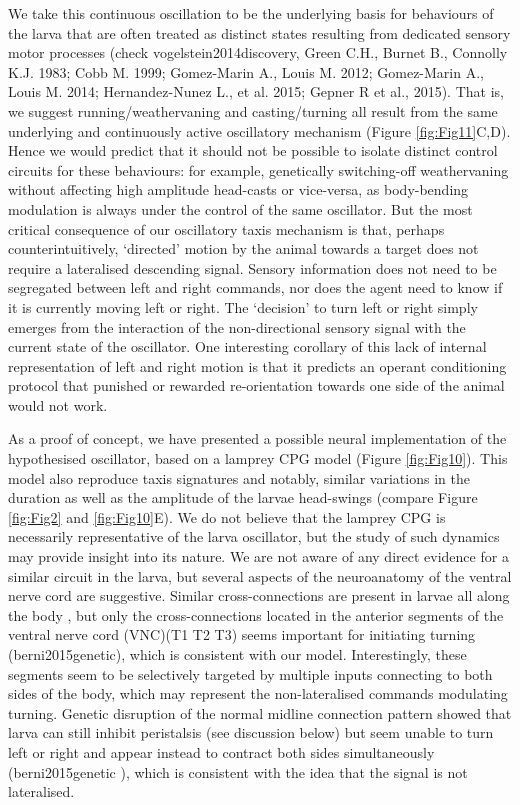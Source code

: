 \documentclass[10pt,a4paper]{article}
\begin{document}
We take this continuous oscillation to be the underlying basis for behaviours of the larva that are often treated as distinct states resulting from dedicated sensory motor processes (check vogelstein2014discovery, Green C.H., Burnet B., Connolly K.J. 1983; Cobb M. 1999; Gomez-Marin A., Louis M. 2012; Gomez-Marin A., Louis M. 2014; Hernandez-Nunez L., et al. 2015; Gepner R et al., 2015). That is, we suggest running/weathervaning and casting/turning all result from the same underlying and continuously active oscillatory mechanism (Figure \ref{fig:Fig11}C,D). Hence we would predict that it should not be possible to isolate distinct control circuits for these behaviours: for example, genetically switching-off weathervaning without affecting high amplitude head-casts or vice-versa, as body-bending modulation is always under the control of the same oscillator. But the most critical consequence of our oscillatory taxis mechanism is that, perhaps counterintuitively, ‘directed’ motion by the animal towards a target does not require a lateralised descending signal. Sensory information does not need to be segregated between left and right commands, nor does the agent need to know if it is currently moving left or right. The ‘decision’ to turn left or right simply emerges from the interaction of the non-directional sensory signal with the current state of the oscillator. 
One interesting corollary of this lack of internal representation of left and right motion is that it predicts an operant conditioning protocol that punished or rewarded re-orientation towards one side of the animal would not work.


As a proof of concept, we have presented a possible neural implementation of the hypothesised oscillator, based on a lamprey CPG model (Figure \ref{fig:Fig10}). This model also reproduce taxis signatures and notably, similar variations in the duration as well as the amplitude of the larvae head-swings (compare Figure \ref{fig:Fig2} and \ref{fig:Fig10}E). We do not believe that the lamprey CPG is necessarily representative of the larva oscillator, but the study of such dynamics may provide insight into its nature. We are not aware of any direct evidence for a similar circuit in the larva, but several aspects of the neuroanatomy of the ventral nerve cord are suggestive. Similar cross-connections are present in larvae all along the body , but only the cross-connections located in the anterior segments of the ventral nerve cord (VNC)(T1 T2 T3) seems important for initiating turning (berni2015genetic), which is consistent with our model. Interestingly, these segments seem to be selectively targeted by multiple inputs connecting to both sides of the body, which may represent the non-lateralised commands modulating turning. Genetic disruption of the normal midline connection pattern showed that larva can still inhibit peristalsis (see discussion below) but seem unable to turn left or right and appear instead to contract both sides simultaneously (berni2015genetic ), which is consistent with the idea that the signal is not lateralised. 
\end{document}
